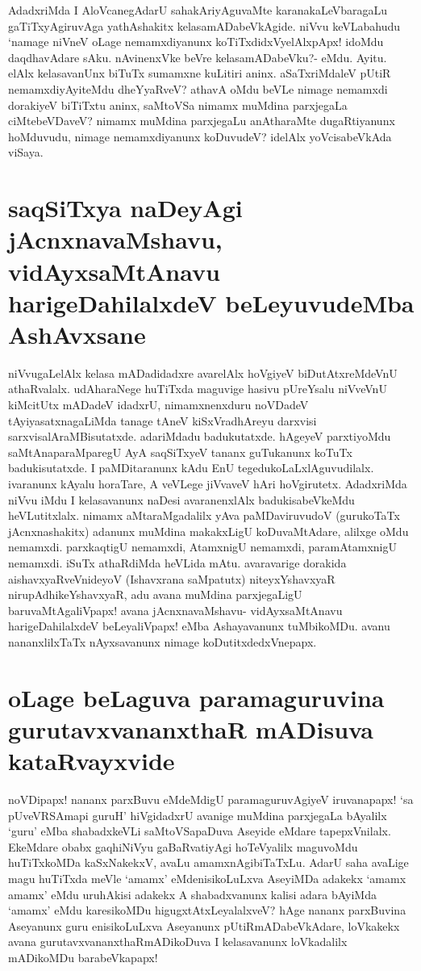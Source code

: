 AdadxriMda I AloVcanegAdarU sahakAriyAguvaMte karanakaLeVbaragaLu gaTiTxyAgiruvAga yathAshakitx kelasamADabeVkAgide. niVvu keVLabahudu `namage niVneV oLage nemamxdiyanunx koTiTxdidxVyelAlxpApx! idoMdu daqdhavAdare sAku. nAvinenxVke beVre kelasamADabeVku?- eMdu. Ayitu. elAlx kelasavanUnx biTuTx sumamxne kuLitiri aninx. aSaTxriMdaleV pUtiR nemamxdiyAyiteMdu dheYyaRveV? athavA oMdu beVLe nimage nemamxdi dorakiyeV biTiTxtu aninx, saMtoVSa nimamx muMdina parxjegaLa ciMtebeVDaveV? nimamx muMdina parxjegaLu anAtharaMte dugaRtiyanunx hoMduvudu, nimage nemamxdiyanunx koDuvudeV? idelAlx yoVcisabeVkAda viSaya.

\section*{saqSiTxya naDeyAgi jAcnxnavaMshavu, vidAyxsaMtAnavu harigeDahilalxdeV beLeyuvudeMba AshAvxsane}

niVvugaLelAlx kelasa mADadidadxre avarelAlx hoVgiyeV biDutAtxreMdeVnU athaRvalalx. udAharaNege huTiTxda maguvige hasivu pUreYsalu niVveVnU kiMcitUtx mADadeV idadxrU, nimamxnenxduru noVDadeV tAyiyasatxnagaLiMda tanage tAneV kiSxVradhAreyu darxvisi sarxvisalAraMBisutatxde. adariMdadu badukutatxde. hAgeyeV parxtiyoMdu saMtAnaparaMparegU AyA saqSiTxyeV tananx guTukanunx koTuTx badukisutatxde. I paMDitaranunx kAdu EnU tegedukoLaLxlAguvudilalx. ivaranunx kAyalu horaTare, A veVLege jiVvaveV hAri hoVgirutetx. AdadxriMda niVvu iMdu I kelasavanunx naDesi avaranenxlAlx badukisabeVkeMdu heVLutitxlalx. nimamx aMtaraMgadalilx yAva paMDaviruvudoV (gurukoTaTx jAcnxnashakitx) adanunx muMdina makakxLigU koDuvaMtAdare, alilxge oMdu nemamxdi. parxkaqtigU nemamxdi, AtamxnigU nemamxdi, paramAtamxnigU nemamxdi. iSuTx athaRdiMda heVLida mAtu. avaravarige dorakida aishavxyaRveVnideyoV (Ishavxrana saMpatutx) niteyxYshavxyaR nirupAdhikeYshavxyaR, adu avana muMdina parxjegaLigU baruvaMtAgaliVpapx! avana jAcnxnavaMshavu- vidAyxsaMtAnavu harigeDahilalxdeV beLeyaliVpapx! eMba Ashayavanunx tuMbikoMDu. avanu nananxlilxTaTx nAyxsavanunx nimage koDutitxdedxVnepapx.

\section*{oLage beLaguva paramaguruvina gurutavxvananxthaR mADisuva kataRvayxvide}

noVDipapx! nananx parxBuvu eMdeMdigU paramaguruvAgiyeV iruvanapapx! `sa pUveVRSAmapi\label{129} guruH' hiVgidadxrU avanige muMdina parxjegaLa bAyalilx `guru' eMba shabadxkeVLi saMtoVSapaDuva Aseyide eMdare tapepxVnilalx. EkeMdare obabx gaqhiNiVyu gaBaRvatiyAgi hoTeVyalilx maguvoMdu huTiTxkoMDa kaSxNakekxV, avaLu amamxnAgibiTaTxLu. AdarU saha avaLige magu huTiTxda meVle `amamx' eMdenisikoLuLxva AseyiMDa adakekx `amamx amamx' eMdu uruhAkisi adakekx A shabadxvanunx kalisi adara bAyiMda `amamx' eMdu karesikoMDu higugxtAtxLeyalalxveV? hAge nananx parxBuvina Aseyanunx guru enisikoLuLxva Aseyanunx pUtiRmADabeVkAdare, loVkakekx avana gurutavxvananxthaRmADikoDuva I kelasavanunx loVkadalilx mADikoMDu barabeVkapapx!

